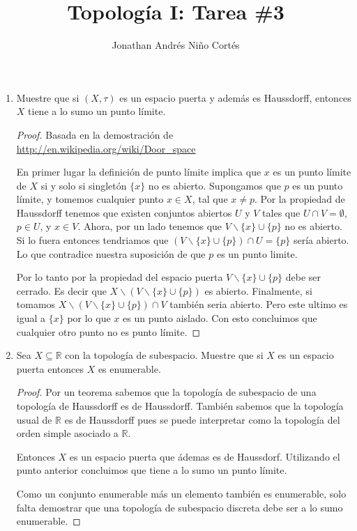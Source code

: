 \documentclass[letter,twoside,11pt]{article}
\title{Topolog\'ia I: Tarea \#3}
\author{Jonathan Andr\'es Ni\~no Cort\'es}
\begin{document}
\maketitle
\begin{enumerate}
\item Muestre que si $(X,\tau)$ es un espacio puerta y adem\'as es Haussdorff, entonces $X$ tiene a lo sumo un punto l\'imite.
\begin{proof}
Basada en la demostraci\'on de \url{http://en.wikipedia.org/wiki/Door_space}

En primer lugar la definici\'on de punto l\'imite implica que $x$ es un punto l\'imite de $X$ si y solo si singlet\'on $\{x\}$ no es abierto.
Supongamos que $p$ es un punto l\'imite, y tomemos cualquier punto $x \in X$, tal que $x \not = p$. Por la propiedad de Haussdorff tenemos que existen conjuntos abiertos $U$ y $V$ tales que $U \cap V = \emptyset$, $p \in U$, y $x \in V$. Ahora, por un lado tenemos que $V\backslash\{x\}\cup\{p\}$ no es abierto. Si lo fuera entonces tendriamos que $(V\backslash\{x\}\cup\{p\})\cap U= \{p\}$ ser\'ia abierto. Lo que contradice nuestra suposici\'on de que $p$ es un punto limite.

Por lo tanto por la propiedad del espacio puerta $V\backslash\{x\}\cup\{p\}$ debe ser cerrado. Es decir que $X\backslash(V\backslash\{x\}\cup\{p\})$ es abierto. Finalmente, si tomamos $X\backslash(V\backslash\{x\}\cup\{p\})\cap V$ tambi\'en seria abierto. Pero este ultimo es igual a $\{x\}$ por lo que $x$ es un punto aislado. Con esto concluimos que cualquier otro punto no es punto l\'imite.
\end{proof}
\item Sea $X \subseteq \mathbb{R}$ con la topolog\'ia de subespacio. Muestre que si $X$ es un espacio puerta entonces $X$ es enumerable.

\begin{proof}
Por un teorema sabemos que la topolog\'ia de subespacio de una topolog\'ia de Haussdorff es de Haussdorff. Tambi\'en sabemos que la topolog\'ia usual de $\mathbb{R}$ es de Haussdorff pues se puede interpretar como la topolog\'ia del orden simple asociado a $\mathbb{R}$.

Entonces $X$ es un espacio puerta que \'ademas es de Haussdorf. Utilizando el punto anterior concluimos que tiene a lo sumo un punto l\'imite.

Como un conjunto enumerable m\'as un elemento tambi\'en es enumerable, solo falta demostrar que una topolog\'ia de subespacio discreta debe ser a lo sumo enumerable.


\end{proof}
\end{enumerate}
\end{document}
